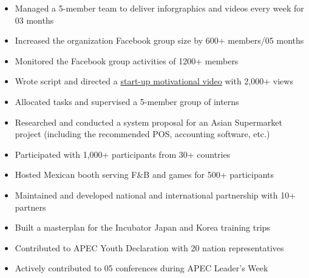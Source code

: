 \documentclass[10pt,a4paper,ragged2e]{altacv}
\begin{document}
\divider

\begin{itemize}
	\item Managed a 5-member team to deliver inforgraphics and videos every week for 03 months 
	\item Increased the organization Facebook group size by 600+ members/05 months
	\item Monitored the Facebook group activities of 1200+ members
	\item Wrote script and directed a {\href{https://www.facebook.com/uavsnsw/videos/433640800560301/}{start-up motivational video}} with 2,000+ views
\end{itemize}

\divider

\begin{itemize}
	\item Allocated tasks and supervised a 5-member group of interns
	\item Researched and conducted a system proposal for an Asian Supermarket project (including the recommended POS, accounting software, etc.)
\end{itemize}


\begin{itemize}
	\item Participated with 1,000+ participants from 30+ countries
	\item Hosted Mexican booth serving F\&B and games for 500+ participants
\end{itemize}

\divider

\begin{itemize}
	\item Maintained and developed national and international partnership with 10+ partners
	\item Built a masterplan for the Incubator Japan and Korea training trips 
\end{itemize}

\divider

\begin{itemize}
	\item Contributed to APEC Youth Declaration with 20 nation representatives
	\item Actively contributed to 05 conferences during APEC Leader's Week
\end{itemize}
\end{document}
